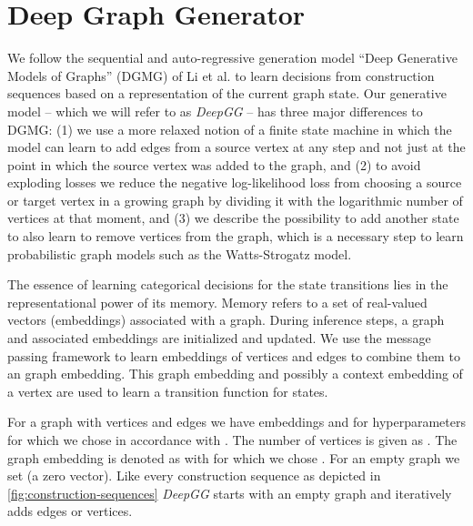 \documentclass{article}
\begin{document}
 \section{Deep Graph Generator}\label{sec:deepgg}
We follow the sequential and auto-regressive generation model ``Deep Generative Models of Graphs'' (DGMG) of Li et al. \cite{li2018learning} to learn decisions from construction sequences based on a representation of the current graph state.
Our generative model -- which we will refer to as \textit{DeepGG} -- has three major differences to DGMG:
(1) we use a more relaxed notion of a finite state machine in which the model can learn to add edges from a source vertex at any step and not just at the point in which the source vertex was added to the graph, and
(2) to avoid exploding losses we reduce the negative log-likelihood loss from choosing a source or target vertex in a growing graph by dividing it with the logarithmic number of vertices at that moment, and
(3) we describe the possibility to add another state to also learn to remove vertices from the graph, which is a necessary step to learn probabilistic graph models such as the Watts-Strogatz model.

The essence of learning categorical decisions for the state transitions lies in the representational power of its memory.
Memory refers to a set of real-valued vectors (embeddings) associated with a graph.
During inference steps, a graph and associated embeddings are initialized and updated.
We use the message passing framework to learn embeddings of vertices and edges to combine them to an graph embedding.
This graph embedding and possibly a context embedding of a vertex are used to learn a transition function for states.

For a graph  with vertices  and edges  we have embeddings  and  for hyperparameters  for which we chose  in accordance with \cite{li2018learning}.
The number of vertices is given as .
The graph embedding is denoted as  with  for which we chose .
For an empty graph we set  (a zero vector).
Like every construction sequence as depicted in \autoref{fig:construction-sequences} \textit{DeepGG} starts with an empty graph and iteratively adds edges or vertices.
\end{document}
